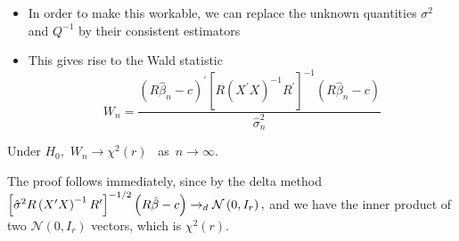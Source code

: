 \documentclass[notes=show]{beamer}
\begin{document}
\begin{frame}%


\begin{itemize}
\item In order to make this workable, we can replace the unknown quantities $%
\sigma ^{2}$ and $Q^{-1}$ by their consistent estimators

\item This gives rise to the Wald statistic%
\begin{equation*}
W_{n}=\frac{\left( R\hat{\beta}_{n}-c\right) ^{\prime }\left[ R\left(
X^{\prime }X\right) ^{-1}R^{\prime }\right] ^{-1}\left( R\hat{\beta}%
_{n}-c\right) }{\widehat{\sigma }_{n}^{2}}
\end{equation*}
\end{itemize}

\begin{theorem}
Under $H_{0},$ $W_{n}\rightarrow \chi ^{2}\left( r\right) \;\;\;$as\ $%
n\rightarrow \infty .$
\end{theorem}

The proof follows immediately, since by the delta method $\left[ \hat{\sigma}%
^{2}R\left( X^{\prime }X\right) ^{-1}R^{\prime }\right] ^{-1/2}\left( R\hat{%
\beta}-c\right) \rightarrow _{d}\mathcal{N}\left( 0,I_{r}\right) ,$ and we
have the inner product of two $\mathcal{N}\left( 0,I_{r}\right) $ vectors,
which is $\chi ^{2}\left( r\right) .$

\end{frame}%
\end{document}
